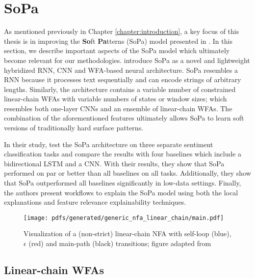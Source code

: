 \section{SoPa}

\label{section:sopa}

As mentioned previously in Chapter \ref{chapter:introduction}, a key focus of
this thesis is in improving the \textbf{So}ft \textbf{Pa}tterns (SoPa) model
presented in \citet{schwartz2018sopa}. In this section, we describe important
aspects of the SoPa model which ultimately become relevant for our
methodologies. \citet{schwartz2018sopa} introduce SoPa as a novel and
lightweight hybridized RNN, CNN and WFA-based neural architecture. SoPa
resembles a RNN because it processes text sequentially and can encode strings of
arbitrary lengths. Similarly, the architecture contains a variable number of
constrained linear-chain WFAs with variable numbers of states or window sizes;
which resembles both one-layer CNNs and an ensemble of linear-chain WFAs. The
combination of the aforementioned features ultimately allows SoPa to learn soft
versions of traditionally hard surface patterns.

In their study, \citet{schwartz2018sopa} test the SoPa architecture on three
separate sentiment classification tasks and compare the results with four
baselines which include a bidirectional LSTM and a CNN. With their results, they
show that SoPa performed on par or better than all baselines on all tasks.
Additionally, they show that SoPa outperformed all baselines significantly in
low-data settings. Finally, the authors present workflows to explain the SoPa
model using both the local explanations and feature relevance explainability
techniques.

\begin{figure}[t]
  \centering
  \texttt{[image: pdfs/generated/generic\_nfa\_linear\_chain/main.pdf]}
  \caption{Visualization of a (non-strict) linear-chain NFA with
    self-loop (blue), $\epsilon$ (red) and main-path (black) transitions; figure
    adapted from \citet{schwartz2018sopa}}
  \label{fig:fa}
\end{figure}

\subsection{Linear-chain WFAs}

\label{section:sopa_lc_wfa}

